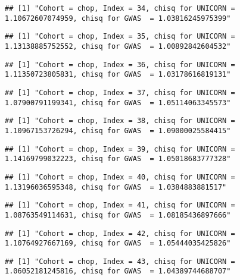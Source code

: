\documentclass[]{article}
\begin{document}
\begin{verbatim}
## [1] "Cohort = chop, Index = 34, chisq for UNICORN = 1.10672607074959, chisq for GWAS  = 1.03816245975399"
\end{verbatim}

\begin{verbatim}
## [1] "Cohort = chop, Index = 35, chisq for UNICORN = 1.13138885752552, chisq for GWAS  = 1.00892842604532"
\end{verbatim}

\begin{verbatim}
## [1] "Cohort = chop, Index = 36, chisq for UNICORN = 1.11350723805831, chisq for GWAS  = 1.03178616819131"
\end{verbatim}

\begin{verbatim}
## [1] "Cohort = chop, Index = 37, chisq for UNICORN = 1.07900791199341, chisq for GWAS  = 1.05114063345573"
\end{verbatim}

\begin{verbatim}
## [1] "Cohort = chop, Index = 38, chisq for UNICORN = 1.10967153726294, chisq for GWAS  = 1.09000025584415"
\end{verbatim}

\begin{verbatim}
## [1] "Cohort = chop, Index = 39, chisq for UNICORN = 1.14169799032223, chisq for GWAS  = 1.05018683777328"
\end{verbatim}

\begin{verbatim}
## [1] "Cohort = chop, Index = 40, chisq for UNICORN = 1.13196036595348, chisq for GWAS  = 1.0384883881517"
\end{verbatim}

\begin{verbatim}
## [1] "Cohort = chop, Index = 41, chisq for UNICORN = 1.08763549114631, chisq for GWAS  = 1.08185436897666"
\end{verbatim}

\begin{verbatim}
## [1] "Cohort = chop, Index = 42, chisq for UNICORN = 1.10764927667169, chisq for GWAS  = 1.05444035425826"
\end{verbatim}

\begin{verbatim}
## [1] "Cohort = chop, Index = 43, chisq for UNICORN = 1.06052181245816, chisq for GWAS  = 1.04389744688707"
\end{verbatim}
\end{document}
